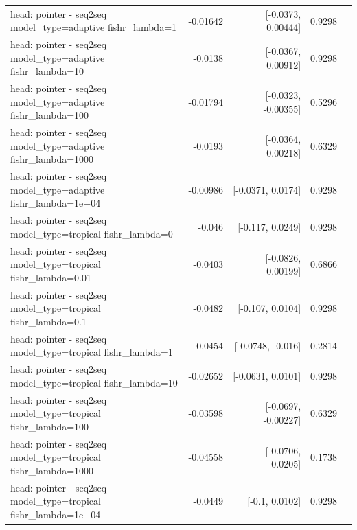 \documentclass[10pt]{article}
\makeatletter
\newcommand{\stackcell}[1]{\begin{tabular}[t]{@{}l@{}}#1\end{tabular}}
\makeatother
\begin{document}
{\begin{longtable}{lrrrl}
\stackcell{head: pointer - seq2seq\\\footnotesize model\_type=adaptive fishr\_lambda=1 } & -0.01642 & [-0.0373, 0.00444] & 0.9298 & \\
\stackcell{head: pointer - seq2seq\\\footnotesize model\_type=adaptive fishr\_lambda=10 } & -0.0138 & [-0.0367, 0.00912] & 0.9298 & \\
\stackcell{head: pointer - seq2seq\\\footnotesize model\_type=adaptive fishr\_lambda=100 } & -0.01794 & [-0.0323, -0.00355] & 0.5296 & \\
\stackcell{head: pointer - seq2seq\\\footnotesize model\_type=adaptive fishr\_lambda=1000 } & -0.0193 & [-0.0364, -0.00218] & 0.6329 & \\
\stackcell{head: pointer - seq2seq\\\footnotesize model\_type=adaptive fishr\_lambda=1e+04 } & -0.00986 & [-0.0371, 0.0174] & 0.9298 & \\
\stackcell{head: pointer - seq2seq\\\footnotesize model\_type=tropical fishr\_lambda=0 } & -0.046 & [-0.117, 0.0249] & 0.9298 & \\
\stackcell{head: pointer - seq2seq\\\footnotesize model\_type=tropical fishr\_lambda=0.01 } & -0.0403 & [-0.0826, 0.00199] & 0.6866 & \\
\stackcell{head: pointer - seq2seq\\\footnotesize model\_type=tropical fishr\_lambda=0.1 } & -0.0482 & [-0.107, 0.0104] & 0.9298 & \\
\stackcell{head: pointer - seq2seq\\\footnotesize model\_type=tropical fishr\_lambda=1 } & -0.0454 & [-0.0748, -0.016] & 0.2814 & \\
\stackcell{head: pointer - seq2seq\\\footnotesize model\_type=tropical fishr\_lambda=10 } & -0.02652 & [-0.0631, 0.0101] & 0.9298 & \\
\stackcell{head: pointer - seq2seq\\\footnotesize model\_type=tropical fishr\_lambda=100 } & -0.03598 & [-0.0697, -0.00227] & 0.6329 & \\
\stackcell{head: pointer - seq2seq\\\footnotesize model\_type=tropical fishr\_lambda=1000 } & -0.04558 & [-0.0706, -0.0205] & 0.1738 & \\
\stackcell{head: pointer - seq2seq\\\footnotesize model\_type=tropical fishr\_lambda=1e+04 } & -0.0449 & [-0.1, 0.0102] & 0.9298 & \\

\end{longtable}}
\end{document}
